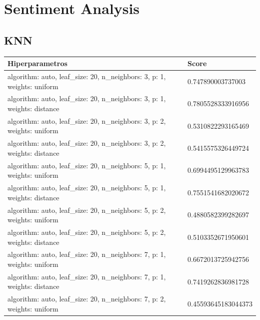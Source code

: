 \documentclass{report}
\begin{document}
{        \section{Sentiment Analysis}
            \subsection{KNN}
                \label{tab:resultados_analisis_sentimientos} 
                    \begin{longtable}{|p{295.6px}|p{100.3px}|}
                    \hline
                    \textbf{Hiperparametros} & \textbf{Score}\\
                    \hline                    
                    algorithm: auto, leaf\_size: 20, n\_neighbors: 3, p: 1, weights: uniform & 0.747890003737003 \\
                    \hline
                    algorithm: auto, leaf\_size: 20, n\_neighbors: 3, p: 1, weights: distance & 0.7805528333916956 \\
                    \hline
                    algorithm: auto, leaf\_size: 20, n\_neighbors: 3, p: 2, weights: uniform & 0.5310822293165469 \\
                    \hline
                    algorithm: auto, leaf\_size: 20, n\_neighbors: 3, p: 2, weights: distance & 0.5415575326449724 \\
                    \hline
                    algorithm: auto, leaf\_size: 20, n\_neighbors: 5, p: 1, weights: uniform & 0.6994495129963783 \\
                    \hline
                    algorithm: auto, leaf\_size: 20, n\_neighbors: 5, p: 1, weights: distance & 0.7551541682020672 \\
                    \hline
                    algorithm: auto, leaf\_size: 20, n\_neighbors: 5, p: 2, weights: uniform & 0.4880582399282697 \\
                    \hline
                    algorithm: auto, leaf\_size: 20, n\_neighbors: 5, p: 2, weights: distance & 0.5103352671950601 \\
                    \hline
                    algorithm: auto, leaf\_size: 20, n\_neighbors: 7, p: 1, weights: uniform & 0.6672013725942756 \\
                    \hline
                    algorithm: auto, leaf\_size: 20, n\_neighbors: 7, p: 1, weights: distance & 0.7419262836981728 \\
                    \hline
                    algorithm: auto, leaf\_size: 20, n\_neighbors: 7, p: 2, weights: uniform & 0.45593645183044373 \\

\end{longtable}}
\end{document}
